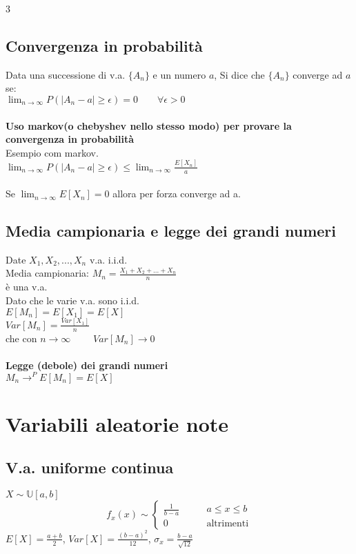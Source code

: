 \documentclass{article}
\begin{document}
\begin{multicols*}{3}
		
		\subsection{Convergenza in probabilità}
		Data una successione di v.a. \(\{A_n\}\) e un numero \(a\), Si dice che \(\{A_n\}\) converge ad \(a\) se:\\
		\(\lim_{n \rightarrow \infty} P(|A_n - a| \geq \epsilon ) = 0 \qquad \forall \epsilon > 0\)\\\\
		\textbf{Uso markov(o chebyshev nello stesso modo) per provare la convergenza in probabilità}\\
		Esempio com markov.\\
		\(\lim_{n \rightarrow \infty} P(|A_n - a| \geq \epsilon ) \leq \lim_{n \rightarrow\infty}\frac{E[X_n]}{a} \)\\\\
		Se \(\lim_{n \rightarrow\infty}E[X_n] = 0\) allora per forza converge ad a.\\
		
		\subsection{Media campionaria e legge dei grandi numeri}
		Date \(X_1,X_2,...,X_n\) v.a. i.i.d.\\
		Media campionaria: \(M_n= \frac{X_1+X_2+...+X_n}{n} \)\\ è una v.a.\\
		Dato che le varie v.a. sono i.i.d.\\ \(E[M_n] =E[X_1]=E[X]\)\\
		\(Var[M_n] = \frac{Var[X_1]}{n} \)\\ che con \(n \rightarrow \infty \qquad\) \(Var[M_n] \rightarrow 0\)\\\\
		\textbf{Legge (debole) dei grandi numeri}\\
		\(M_n \longrightarrow^P E[M_n] = E[X]\)\\
		
		
		
		\section{Variabili aleatorie note}
		
		\subsection{V.a. uniforme continua}
		\(X \sim \mathbb{U}[a,b] \)\\
		\begin{equation*}
			f_x (x) \sim
			\left\{
			\begin{alignedat}{2}
				\frac{1}{b-a}  & \qquad a\leq x \leq b\\
				0            & \qquad \text{altrimenti}
			\end{alignedat}
			\right.
		\end{equation*}
		\(E[X] = \frac{a+b}{2}\), \(Var[X] = \frac{(b-a)^2}{12}\), \(\sigma_x = \frac{b-a}{\sqrt{12}}\)\\
		

\end{multicols*}
\end{document}
